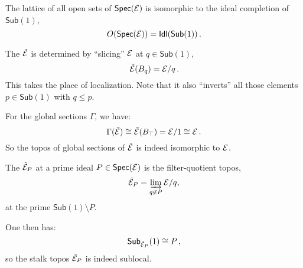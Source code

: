 \documentclass[lambek.tex]{subfiles}
\begin{document}
The lattice of all open sets of $\mathsf{Spec}(\mathcal{E})$ is isomorphic to the ideal completion of $\mathsf{Sub}(1)$,
$$O(\mathsf{Spec}(\mathcal{E})) = \mathsf{Idl}(\mathsf{Sub}(1))\,.$$

%



The  $\tilde{\mathcal{E}}$ is determined by ``slicing'' $\mathcal{E}$ at $q \in\mathsf{Sub}(1)$,
\[
\tilde{\mathcal{E}}(B_q) = \mathcal{E}/q\,.
\]
This takes the place of localization.  Note that it also ``inverts'' all those elements $p\in \mathsf{Sub}(1)$ with $q\leq p$. 
\bigskip

For the global sections $\Gamma$, we have:
$$\Gamma(\tilde{\mathcal{E}}) \cong \tilde{\mathcal{E}}(B_\top) = \mathcal{E}/1 \cong \mathcal{E}\,.$$
So the topos of global sections of $\tilde{\mathcal{E}}$ is indeed  isomorphic to $\mathcal{E}$.

The  $\tilde{\mathcal{E}}_P$ at a prime ideal $P\in \mathsf{Spec}(\mathcal{E})$ is the filter-quotient topos,
\[
\tilde{\mathcal{E}}_P = \varinjlim_{q\not\in P} \mathcal{E}/q, 
\]
at the prime  $\mathsf{Sub}(1)\!\setminus\! P$.  
\medskip

One then has:
\[
\mathsf{Sub}_{\tilde{\mathcal{E}}_P}(1)\cong P\,,
\]
so the stalk topos $\tilde{\mathcal{E}}_P$ is indeed sublocal.

\end{document}
